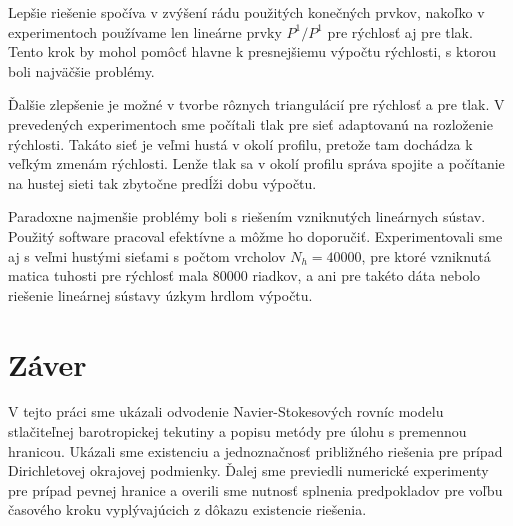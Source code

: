 Lepšie riešenie spočíva v zvýšení rádu použitých konečných prvkov, nakoľko v
experimentoch používame len lineárne prvky $P^1/P^1$ pre rýchlosť aj pre tlak.
Tento krok by mohol pomôcť hlavne k presnejšiemu výpočtu rýchlosti, s ktorou
boli najväčšie problémy. 

Ďalšie zlepšenie je možné v tvorbe rôznych triangulácií pre rýchlosť a pre tlak.
V prevedených experimentoch sme počítali tlak pre sieť adaptovanú na rozloženie
rýchlosti. Takáto sieť je veľmi hustá v okolí profilu, pretože tam dochádza k
veľkým zmenám rýchlosti. Lenže tlak sa v okolí profilu správa spojite a
počítanie na hustej sieti tak zbytočne predĺži dobu výpočtu. 

Paradoxne najmenšie problémy boli s riešením vzniknutých lineárnych sústav.
Použitý software pracoval efektívne a môžme ho doporučiť. Experimentovali sme
aj s veľmi hustými sieťami s počtom vrcholov $N_h=40000$, pre ktoré vzniknutá
matica tuhosti pre rýchlosť mala $80000$ riadkov, a ani pre takéto dáta nebolo
riešenie lineárnej sústavy úzkym hrdlom výpočtu.
 
\chapter{Záver}

V tejto práci sme ukázali odvodenie Navier-Stokesových rovníc modelu
stlačiteľnej barotropickej tekutiny a popisu metódy pre úlohu s premennou
hranicou. 
Ukázali sme existenciu a jednoznačnosť približného riešenia pre prípad
Dirichletovej okrajovej podmienky.
Ďalej sme previedli numerické experimenty pre prípad pevnej hranice a overili
sme nutnosť splnenia predpokladov pre voľbu časového kroku vyplývajúcich z
dôkazu existencie riešenia.
